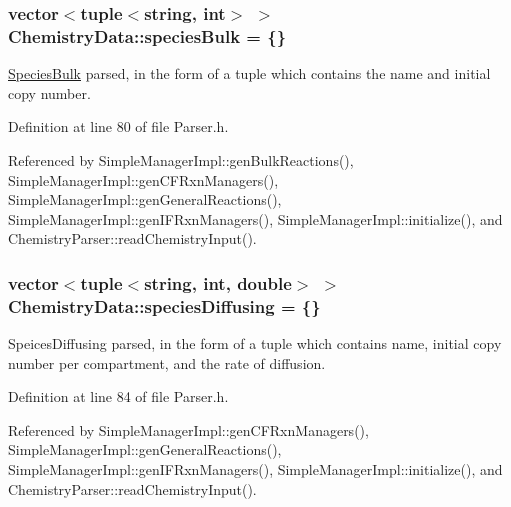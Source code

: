 \hypertarget{structChemistryData_ae9c303af6cd6b503fe45515c4ee5132b}{
\subsubsection[{species\+Bulk}]{\setlength{\rightskip}{0pt plus 5cm}vector$<$tuple$<$string, int$>$ $>$ Chemistry\+Data\+::species\+Bulk = \{\}}}\label{structChemistryData_ae9c303af6cd6b503fe45515c4ee5132b}


\hyperlink{classSpeciesBulk}{Species\+Bulk} parsed, in the form of a tuple which contains the name and initial copy number. 



Definition at line 80 of file Parser.\+h.



Referenced by Simple\+Manager\+Impl\+::gen\+Bulk\+Reactions(), Simple\+Manager\+Impl\+::gen\+C\+F\+Rxn\+Managers(), Simple\+Manager\+Impl\+::gen\+General\+Reactions(), Simple\+Manager\+Impl\+::gen\+I\+F\+Rxn\+Managers(), Simple\+Manager\+Impl\+::initialize(), and Chemistry\+Parser\+::read\+Chemistry\+Input().

\hypertarget{structChemistryData_acf21fd3143fa3bc4e0e1097ce15cb77c}{
\subsubsection[{species\+Diffusing}]{\setlength{\rightskip}{0pt plus 5cm}vector$<$tuple$<$string, int, double$>$ $>$ Chemistry\+Data\+::species\+Diffusing = \{\}}}\label{structChemistryData_acf21fd3143fa3bc4e0e1097ce15cb77c}


Speices\+Diffusing parsed, in the form of a tuple which contains name, initial copy number per compartment, and the rate of diffusion. 



Definition at line 84 of file Parser.\+h.



Referenced by Simple\+Manager\+Impl\+::gen\+C\+F\+Rxn\+Managers(), Simple\+Manager\+Impl\+::gen\+General\+Reactions(), Simple\+Manager\+Impl\+::gen\+I\+F\+Rxn\+Managers(), Simple\+Manager\+Impl\+::initialize(), and Chemistry\+Parser\+::read\+Chemistry\+Input().

